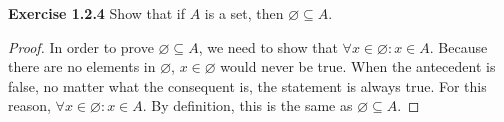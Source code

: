 \documentclass[12pt]{article}
\theoremstyle{definition}
\newtheorem{definition}[theorem]{Definition}
\numberwithin{equation}{subsection}
\begin{document}
\textbf{Exercise 1.2.4} Show that if \(A\) is a set, then \(\varnothing \subseteq A\).

\begin{proof}
In order to prove $\varnothing \subseteq A$, we need to show that $\forall x \in \varnothing: x \in A$. Because there are no elements in $\varnothing$, $x \in \varnothing$ would never be true. When the antecedent is false, no matter what the consequent is, the statement is always true. For this reason, $\forall x \in \varnothing: x \in A$. By definition, this is the same as $\varnothing \subseteq A$.
\end{proof}





\end{document}
